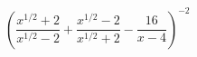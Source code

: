 \begin{ex}[type=expression]
	\begin{condition}
		\( \left( \dfrac{x^{1/2}+2}{x^{1/2}-2}+\dfrac{x^{1/2}-2}{x^{1/2}+2}-\dfrac{16}{x-4} \right)^{-2} \)
	\end{condition}
\end{ex}
